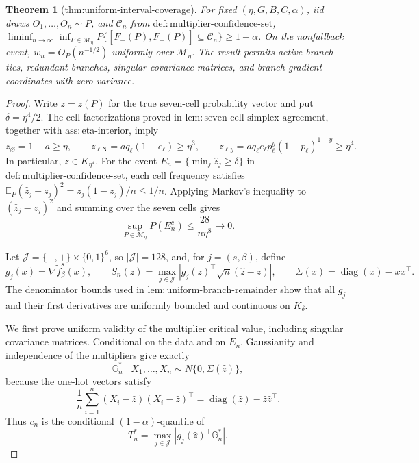 \documentclass{article}
\newtheorem{theorem}{Theorem}
\begin{document}
\begin{theorem}[thm:uniform-interval-coverage]\label{thm:uniform-interval-coverage}
For fixed \((\eta,G,B,C,\alpha)\), iid draws \(O_1,\ldots,O_n\sim P\), and \(\mathcal C_n\) from \(\mathrm{def{:}multiplier\text{-}confidence\text{-}set}\), \(\liminf_{n\to\infty}\inf_{P\in\mathcal M_\eta}P\{[F_-(P),F_+(P)]\subseteq\mathcal C_n\}\geq1-\alpha\). On the nonfallback event, \(w_n=O_P(n^{-1/2})\) uniformly over \(\mathcal M_\eta\). The result permits active branch ties, redundant branches, singular covariance matrices, and branch-gradient coordinates with zero variance.
\end{theorem}
\begin{proof}
Write \(z=z(P)\) for the true seven-cell probability vector and put \(\delta=\eta^4/2\).  The cell factorizations proved in \(\mathrm{lem{:}seven\text{-}cell\text{-}simplex\text{-}agreement}\), together with \(\mathrm{ass{:}eta\text{-}interior}\), imply
\[
 z_\varnothing=1-a\geq\eta,
 \qquad
 z_{\ell\mathrm N}=a q_\ell(1-e_\ell)\geq\eta^3,
 \qquad
 z_{\ell y}=a q_\ell e_\ell p_\ell^y(1-p_\ell)^{1-y}\geq\eta^4.
\]
In particular, \(z\in K_{\eta^4}\).  For the event \(E_n=\{\min_j\widehat z_j\geq\delta\}\) in \(\mathrm{def{:}multiplier\text{-}confidence\text{-}set}\), each cell frequency satisfies \(\mathbb E_P(\widehat z_j-z_j)^2=z_j(1-z_j)/n\leq1/n\).  Applying Markov's inequality to \((\widehat z_j-z_j)^2\) and summing over the seven cells gives
\[
\sup_{P\in\mathcal M_\eta}P(E_n^c)
\leq\frac{28}{n\eta^8}\longrightarrow0.
\]

Let \(\mathcal J=\{-,+\}\times\{0,1\}^6\), so \(|\mathcal J|=128\), and, for \(j=(s,\beta)\), define
\[
 g_j(x)=\nabla\widetilde f_\beta^s(x),
 \qquad
 S_n(z)=\max_{j\in\mathcal J}
 \left|g_j(z)^\top\sqrt n(\widehat z-z)\right|,
 \qquad
 \Sigma(x)=\operatorname{diag}(x)-xx^\top.
\]
The denominator bounds used in \(\mathrm{lem{:}uniform\text{-}branch\text{-}remainder}\) show that all \(g_j\) and their first derivatives are uniformly bounded and continuous on \(K_\delta\).

We first prove uniform validity of the multiplier critical value, including singular covariance matrices.  Conditional on the data and on \(E_n\), Gaussianity and independence of the multipliers give exactly
\[
 \mathbb G_n^*\mid X_1,\ldots,X_n
 \sim N\{0,\Sigma(\widehat z)\},
\]
because the one-hot vectors satisfy
\[
 \frac1n\sum_{i=1}^n(X_i-\widehat z)(X_i-\widehat z)^\top
 =\operatorname{diag}(\widehat z)-\widehat z\widehat z^\top.
\]
Thus \(c_n\) is the conditional \((1-\alpha)\)-quantile of
\[
 T_n^*=\max_{j\in\mathcal J}
 \left|g_j(\widehat z)^\top\mathbb G_n^*\right|.
\]


\end{proof}
\end{document}
